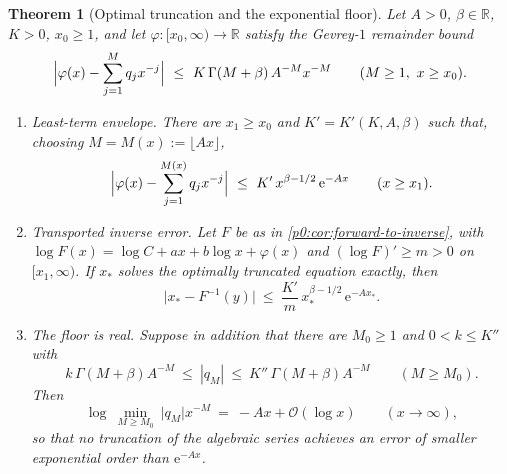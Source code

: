 \documentclass[11pt,a4paper,oneside]{book}
\theoremstyle{plain}
\newtheorem{theorem}{Theorem}[chapter]
\theoremstyle{definition}
\theoremstyle{remark}
\newcommand{\Real}{\mathbb{R}}
\newcommand{\e}{\mathrm{e}}
\newcommand{\bigO}{\mathcal{O}}
\begin{document}
\begin{theorem}[Optimal truncation and the exponential floor]
\label{p0:thm:optimal-truncation}
Let $A>0$, $\beta\in\Real$, $K>0$, $x_0\ge1$, and let
$\varphi:[x_0,\infty)\to\Real$ satisfy the \emph{Gevrey-$1$ remainder bound}
\begin{equation}\label{p0:eq:gevrey-remainder}
 \Bigl|\varphi(x)-\sum_{j=1}^{M}q_jx^{-j}\Bigr|
 \ \le\ K\,\Gamma(M+\beta)\,A^{-M}x^{-M}
 \qquad(M\ge1,\ x\ge x_0).
\end{equation}
\begin{enumerate}
\item \emph{Least-term envelope.}  There are $x_1\ge x_0$ and
      $K'=K'(K,A,\beta)$ such that, choosing $M=M(x):=\lfloor Ax\rfloor$,
      \begin{equation}\label{p0:eq:least-term}
       \Bigl|\varphi(x)-\sum_{j=1}^{M(x)}q_jx^{-j}\Bigr|
       \ \le\ K'\,x^{\beta-1/2}\,\e^{-Ax}
       \qquad(x\ge x_1).
      \end{equation}
\item \emph{Transported inverse error.}  Let $F$ be as in
      \cref{p0:cor:forward-to-inverse}, with
      $\log F(x)=\log C+ax+b\log x+\varphi(x)$ and $(\log F)'\ge m>0$ on
      $[x_1,\infty)$.  If $x_\ast$ solves the optimally truncated equation
      exactly, then
      \begin{equation}\label{p0:eq:optimal-inverse}
       \bigl|x_\ast-F^{-1}(y)\bigr|
       \ \le\ \frac{K'}{m}\,x_\ast^{\beta-1/2}\,\e^{-Ax_\ast}.
      \end{equation}
\item \emph{The floor is real.}  Suppose in addition that there are
      $M_0\ge1$ and $0<k\le K'' $ with
      \begin{equation}\label{p0:eq:two-sided-coefficients}
       k\,\Gamma(M+\beta)A^{-M}\ \le\ |q_M|\ \le\ K''\,\Gamma(M+\beta)A^{-M}
       \qquad(M\ge M_0).
      \end{equation}
      Then
      \begin{equation}\label{p0:eq:floor}
       \log\ \min_{M\ge M_0}\ \bigl|q_M\bigr|x^{-M}
       \ =\ -Ax+\bigO(\log x)
       \qquad(x\to\infty),
      \end{equation}
      so that \emph{no} truncation of the algebraic series achieves an error
      of smaller exponential order than $\e^{-Ax}$.
\end{enumerate}
\end{theorem}
\end{document}
